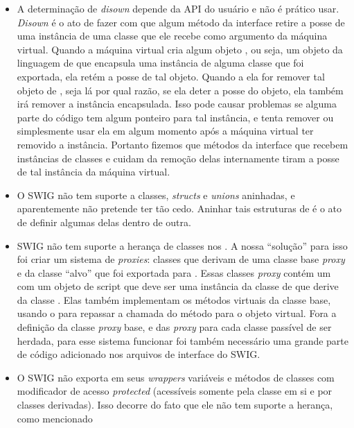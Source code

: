   \begin{itemize}
    \item A determinação de \textit{disown} depende da API do usuário e não é prático usar.
      \textit{Disown} é o ato de fazer com que algum método da interface \CXX{} retire a posse
      de uma instância de uma classe \CXX{} que ele recebe como argumento da máquina virtual. 
      Quando a máquina virtual cria algum objeto \CXX{}, ou seja, um objeto da linguagem de 
      \script{} que encapsula uma instância de alguma classe \CXX{} que foi exportada, ela
      retém a posse de tal objeto. Quando a ela for remover tal objeto de \script{}, seja 
      lá por qual razão, se ela deter a posse do objeto, ela também irá remover a instância 
      \CXX{} encapsulada. Isso pode causar problemas se alguma parte do código \CXX{} tem 
      algum ponteiro para tal instância, e tenta remover ou simplesmente usar ela em algum
      momento após a máquina virtual ter removido a instância. Portanto fizemos que métodos
      da interface \CXX{} que recebem instâncias de classes e cuidam da remoção delas 
      internamente tiram a posse de tal instância da máquina virtual.
    \item O SWIG não tem suporte a classes, \textit{structs} e \textit{unions} aninhadas, e 
      aparentemente não pretende ter tão cedo. Aninhar tais estruturas de \CXX{} é o ato
      de definir algumas delas dentro de outra.
    \item SWIG não tem suporte a herança de classes \CXX{} nos . A nossa ``solução''
      para isso foi criar um sistema de \textit{proxies}: classes \CXX{} que derivam de uma
      classe base \textit{proxy} e da classe ``alvo'' \CXX{} que foi exportada para \script{}.
      Essas classes \textit{proxy} contém um \VObj{} com um objeto de script que deve ser uma
      instância da classe de \script{} que derive da classe \CXX{}. Elas também implementam 
      os métodos virtuais da classe base, usando o \VObj{} para repassar a chamada do método
      para o objeto virtual. Fora a definição da classe \textit{proxy} base, e das \textit{proxy}
      para cada classe \CXX{} passível de ser herdada, para esse sistema funcionar foi também
      necessário uma grande parte de código adicionado nos arquivos de interface do SWIG.
    \item O SWIG não exporta em seus \textit{wrappers} variáveis e métodos de classes com 
      modificador de acesso \textit{protected} (acessíveis somente pela classe em si e por 
      classes derivadas). Isso decorre do fato que ele não tem suporte a herança, como mencionado

\end{itemize}

